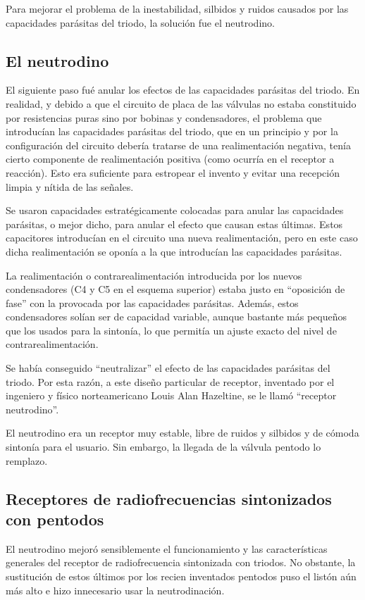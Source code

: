 \documentclass[a4paper,10pt,spanish]{report}
\let\sphinxpxdimen\pdfpxdimen\else\newdimen\sphinxpxdimen
\begin{document}
Para mejorar el problema de la inestabilidad, silbidos y ruidos causados por las capacidades parásitas del triodo, la solución fue el neutrodino.


\subsection{El neutrodino}
\label{\detokenize{introduccion/sistemas:El-neutrodino}}
El siguiente paso fué anular los efectos de las capacidades parásitas del triodo. En realidad, y debido a que el circuito de placa de las válvulas no estaba constituido por resistencias puras sino por bobinas y condensadores, el problema que introducían las capacidades parásitas del triodo, que en un principio y por la configuración del circuito debería tratarse de una realimentación negativa, tenía cierto componente de realimentación positiva (como ocurría en el receptor a reacción). Esto era
suficiente para estropear el invento y evitar una recepción limpia y nítida de las señales.

Se usaron capacidades estratégicamente colocadas para anular las capacidades parásitas, o mejor dicho, para anular el efecto que causan estas últimas. Estos capacitores introducían en el circuito una nueva realimentación, pero en este caso dicha realimentación se oponía a la que introducían las capacidades parásitas.

\sphinxincludegraphics[width=588\sphinxpxdimen,height=226\sphinxpxdimen]{{receprfs3low}.png}

La realimentación o contra\sphinxhyphen{}realimentación introducida por los nuevos condensadores (C4 y C5 en el esquema superior) estaba justo en “oposición de fase” con la provocada por las capacidades parásitas. Además, estos condensadores solían ser de capacidad variable, aunque bastante más pequeños que los usados para la sintonía, lo que permitía un ajuste exacto del nivel de contra\sphinxhyphen{}realimentación.

Se había conseguido “neutralizar” el efecto de las capacidades parásitas del triodo. Por esta razón, a este diseño particular de receptor, inventado por el ingeniero y físico norteamericano Louis Alan Hazeltine, se le llamó “receptor neutrodino”.

El neutrodino era un receptor muy estable, libre de ruidos y silbidos y de cómoda sintonía para el usuario. Sin embargo, la llegada de la válvula pentodo lo remplazo.


\subsection{Receptores de radiofrecuencias sintonizados con pentodos}
\label{\detokenize{introduccion/sistemas:Receptores-de-radiofrecuencias-sintonizados-con-pentodos}}
El neutrodino mejoró sensiblemente el funcionamiento y las características generales del receptor de radiofrecuencia sintonizada con triodos. No obstante, la sustitución de estos últimos por los recien inventados pentodos puso el listón aún más alto e hizo innecesario usar la neutrodinación.
\end{document}
